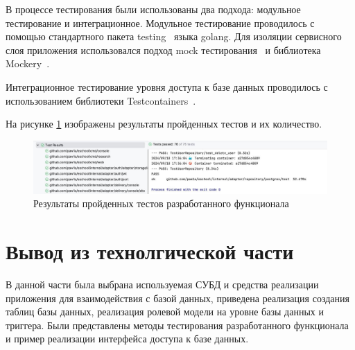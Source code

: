 В процессе тестирования были использованы два подхода: модульное тестирование и интеграционное. Модульное тестирование проводилось с помощью стандартного пакета testing~\cite{go-test} языка golang. Для изоляции сервисного слоя приложения использовался подход mock тестирования~\cite{mock-testing} и библиотека Mockery~\cite{mockery}.

Интеграционное тестирование уровня доступа к базе данных проводилось с использованием библиотеки Testcontainers~\cite{testcontainers}. 

На рисунке \ref{img:tests} изображены результаты пройденных тестов и их количество.

\begin{figure}[H]
	\centering
	\includegraphics[height=0.12\textheight]{inc/img/tests.jpeg}
	\caption{Результаты пройденных тестов разработанного функционала}
	\label{img:tests}
\end{figure}

\section{Вывод из технолгической части}

В данной части была выбрана используемая СУБД и средства реализации приложения для взаимодействия с базой данных, приведена реализация создания таблиц базы данных, реализация ролевой модели на уровне базы данных и триггера. Были представлены методы тестирования разработанного функционала и пример реализации интерфейса доступа к базе данных.
